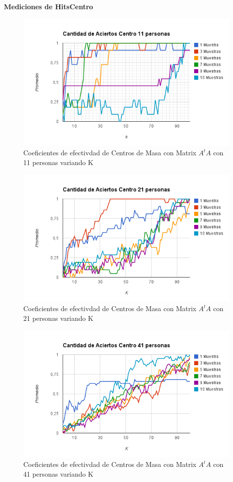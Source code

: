 \textbf{Mediciones de HitsCentro }

\begin{figure}[H]
\includegraphics[width=1\textwidth]{img/image13.png}
     \caption{Coeficientes de efectivdad de Centros de Masa con Matrix $A^tA$ con 11 personas variando K}
\end{figure}

\begin{figure}[H]
\includegraphics[width=1\textwidth]{img/image14.png}
     \caption{Coeficientes de efectivdad de Centros de Masa con Matrix $A^tA$ con 21 personas variando K}
\end{figure}

\begin{figure}[H]
\includegraphics[width=1\textwidth]{img/image15.png}
     \caption{Coeficientes de efectivdad de Centros de Masa con Matrix $A^tA$ con 41 personas variando K}
\end{figure}

